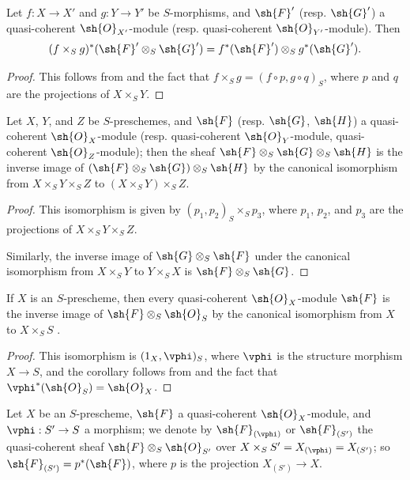 \begin{corollary}[9.1.5]
\label{I.9.1.5}
Let $f:X\to X'$ and $g:Y\to Y'$ be
$S$-morphisms, and $\sh{F}'$ (resp. $\sh{G}'$) a quasi-coherent
$\sh{O}_{X'}$-module (resp. quasi-coherent $\sh{O}_{Y'}$-module). Then
\[
  (f\times_S g)^*(\sh{F}'\otimes_S\sh{G}')=f^*(\sh{F}')\otimes_S g^*(\sh{G}').
\]
\end{corollary}

\begin{proof}
This follows from  and the fact that $f\times_S g=(f\circ p, g\circ q)_S$,
where $p$ and $q$ are the projections of $X\times_S Y$.
\end{proof}

\begin{corollary}[9.1.6]
\label{I.9.1.6}
Let $X$, $Y$, and $Z$ be $S$-preschemes, and $\sh{F}$ (resp. $\sh{G}$, $\sh{H}$) a
quasi-coherent $\sh{O}_X$-module (resp. quasi-coherent $\sh{O}_Y$-module, quasi-coherent
$\sh{O}_Z$-module); then the sheaf $\sh{F}\otimes_S\sh{G}\otimes_S\sh{H}$ is the inverse image
of $(\sh{F}\otimes_S\sh{G})\otimes_S\sh{H}$ by the canonical isomorphism from
$X\times_S Y\times_S Z$ to $(X\times_S Y)\times_S Z$.
\end{corollary}

\begin{proof}
This isomorphism is given by $(p_1,p_2)_S\times_S p_3$, where $p_1$, $p_2$, and $p_3$
are the projections of $X\times_S Y\times_S Z$.

Similarly, the inverse image of $\sh{G}\otimes_S\sh{F}$ under the canonical isomorphism from
$X\times_S Y$ to $Y\times_S X$ is $\sh{F}\otimes_S\sh{G}$.
\end{proof}

\begin{corollary}[9.1.7]
\label{I.9.1.7}
If $X$ is an $S$-prescheme, then every quasi-coherent $\sh{O}_X$-module $\sh{F}$ is the inverse
image of $\sh{F}\otimes_S\sh{O}_S$ by the canonical isomorphism from $X$ to $X\times_S S$
.
\end{corollary}

\begin{proof}
This isomorphism is $(1_X,\vphi)_S$, where $\vphi$ is the structure morphism
$X\to S$, and the corollary follows from  and the fact that
$\vphi^*(\sh{O}_S)=\sh{O}_X$.
\end{proof}

\begin{env}[9.1.8]
\label{I.9.1.8}
Let $X$ be an $S$-prescheme, $\sh{F}$ a quasi-coherent
$\sh{O}_X$-module, and $\vphi:S'\to S$ a morphism; we denote by
$\sh{F}_{(\vphi)}$ or $\sh{F}_{(S')}$ the quasi-coherent sheaf
$\sh{F}\otimes_S\sh{O}_{S'}$ over $X\times_S S'=X_{(\vphi)}=X_{(S')}$; so
$\sh{F}_{(S')}=p^*(\sh{F})$, where $p$ is the projection $X_{(S')}\to X$.
\end{env}

